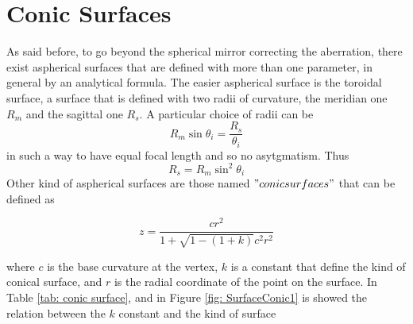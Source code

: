 \section{Conic Surfaces}
As said before, to go beyond the spherical mirror correcting the aberration, there exist aspherical surfaces that are defined with more than one parameter, in general by an analytical formula. The easier aspherical surface is the toroidal surface, a surface that is defined with two radii of curvature, the meridian one $R_m $ and the sagittal one $R_s $. A particular choice of radii can be
\begin{equation}
R_m \sin \theta_i = \frac{R_s}{\theta_i}
\label{eq: toroidal 1}
\end{equation}
\noindent in such a way to have equal focal length and so no asytgmatism. Thus
\begin{equation}
R_s = R_m \sin^2 \theta_i
\end{equation}
Other kind of aspherical surfaces are those named $"conic surfaces"$ that can be defined as

\begin{equation}
	z = \frac{c r^2}{1 + \sqrt{1 - (1 + k)} c^2 r^2}
\end{equation}

\noindent where $c $ is the base curvature at the vertex, $k $ is a constant that define the kind of conical surface, and $r $ is the radial coordinate of the point on the surface. In Table \ref{tab: conic surface}, and in Figure \ref{fig: SurfaceConic1} is showed the relation between the $k $ constant and the kind of surface

